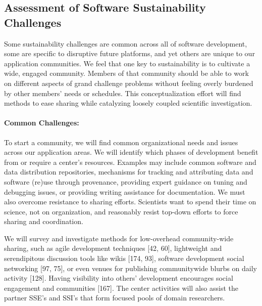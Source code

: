 \subsection{Assessment of Software Sustainability Challenges}
Some sustainability challenges are common across all of software development, some are specific to
disruptive future platforms, and yet others are unique to our application communities. We feel that
one key to sustainability is to cultivate a wide, engaged community. Members of that community
should be able to work on different aspects of grand challenge problems without feeling overly
burdened by other members’ needs or schedules. This conceptualization effort will find methods to
ease sharing while catalyzing loosely coupled scientific investigation.

\paragraph{Common Challenges:} To start a community, we will find common organizational needs and
issues across our application areas. We will identify which phases of development benefit from
or require a center’s resources. Examples may include common software and data distribution
repositories, mechanisms for tracking and attributing data and software (re)use through provenance,
providing expert guidance on tuning and debugging issues, or providing writing assistance for
documentation.
We must also overcome resistance to sharing efforts. Scientists want to spend their time on
science, not on organization, and reasonably resist top-down efforts to force sharing and coordination.

We will survey and investigate methods for low-overhead community-wide sharing, such as agile
development techniques [42, 60], lightweight and serendipitous discussion tools like wikis [174, 93],
software development social networking [97, 75], or even venues for publishing communitywide
blurbs on daily activity [128]. Having visibility into others’ development encourages social
engagement and communities [167]. The center activities will also assist the partner SSE’s and
SSI’s that form focused pools of domain researchers.

